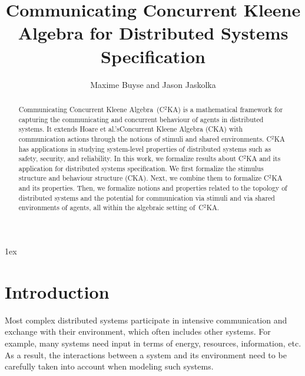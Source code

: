 \documentclass[11pt,a4paper]{article}
\makeatletter
\newcommand{\CKAabbrv}{\textup{CKA}\@\xspace}
\newcommand{\CCKA}{Communicating Concurrent Kleene Algebra\@\xspace}
\newcommand{\CCKAabbrv}{\textup{C$^2$KA}\@\xspace}
\makeatother
\begin{document}
\sloppy

\title{Communicating Concurrent Kleene Algebra for Distributed Systems Specification}
\author{Maxime Buyse and Jason Jaskolka}
\maketitle

\begin{abstract}
\CCKA~(\CCKAabbrv) is a mathematical framework for capturing the communicating and concurrent behaviour of agents in distributed systems. It extends Hoare et al.'s\linebreak Concurrent Kleene Algebra (\CKAabbrv) with communication actions through the notions of stimuli and shared environments. \CCKAabbrv has applications in studying system-level properties of distributed systems such as safety, security, and reliability. In this work, we formalize results about \CCKAabbrv and its application for distributed systems specification. We first formalize the stimulus structure and behaviour structure (\CKAabbrv). Next, we combine them to formalize \CCKAabbrv and its properties. Then, we formalize notions and properties related to the topology of distributed systems and the potential for communication via stimuli and via shared environments of agents, all within the algebraic setting of~\CCKAabbrv. 
\end{abstract}

\tableofcontents


\parindent 0pt
\parskip 1ex

\section{Introduction}
\label{sec:introduction}
Most complex distributed systems participate in intensive communication and exchange with their environment, which often includes other systems. For example, many systems need input in terms of energy, resources, information, etc. As a result, the interactions between a system and its environment need to be carefully taken into account when modeling such systems. 
\end{document}
